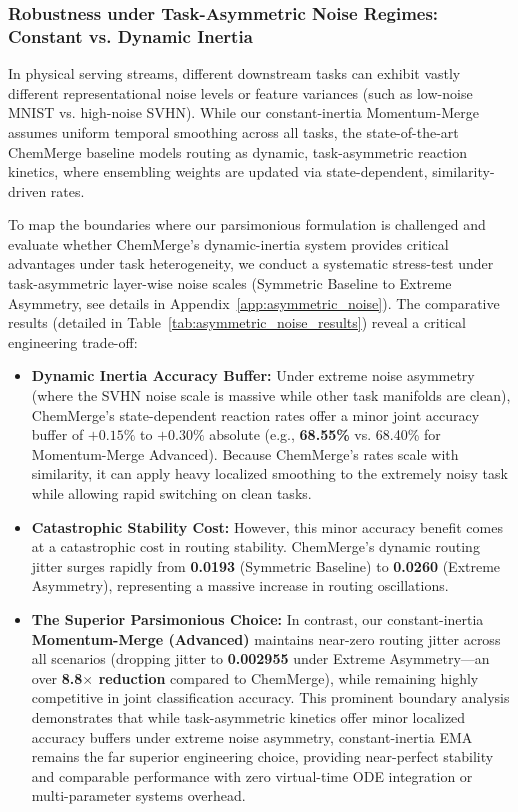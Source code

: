 \subsubsection{Robustness under Task-Asymmetric Noise Regimes: Constant vs. Dynamic Inertia}
In physical serving streams, different downstream tasks can exhibit vastly different representational noise levels or feature variances (such as low-noise MNIST vs. high-noise SVHN). While our constant-inertia Momentum-Merge assumes uniform temporal smoothing across all tasks, the state-of-the-art ChemMerge baseline models routing as dynamic, task-asymmetric reaction kinetics, where ensembling weights are updated via state-dependent, similarity-driven rates. 

To map the boundaries where our parsimonious formulation is challenged and evaluate whether ChemMerge's dynamic-inertia system provides critical advantages under task heterogeneity, we conduct a systematic stress-test under task-asymmetric layer-wise noise scales (Symmetric Baseline to Extreme Asymmetry, see details in Appendix~\ref{app:asymmetric_noise}). The comparative results (detailed in Table~\ref{tab:asymmetric_noise_results}) reveal a critical engineering trade-off:
\begin{itemize}
    \item \textbf{Dynamic Inertia Accuracy Buffer:} Under extreme noise asymmetry (where the SVHN noise scale is massive while other task manifolds are clean), ChemMerge's state-dependent reaction rates offer a minor joint accuracy buffer of $+0.15\%$ to $+0.30\%$ absolute (e.g., \textbf{68.55\%} vs. 68.40\% for Momentum-Merge Advanced). Because ChemMerge's rates scale with similarity, it can apply heavy localized smoothing to the extremely noisy task while allowing rapid switching on clean tasks.
    \item \textbf{Catastrophic Stability Cost:} However, this minor accuracy benefit comes at a catastrophic cost in routing stability. ChemMerge's dynamic routing jitter surges rapidly from \textbf{0.0193} (Symmetric Baseline) to \textbf{0.0260} (Extreme Asymmetry), representing a massive increase in routing oscillations.
    \item \textbf{The Superior Parsimonious Choice:} In contrast, our constant-inertia \textbf{Momentum-Merge (Advanced)} maintains near-zero routing jitter across all scenarios (dropping jitter to \textbf{0.002955} under Extreme Asymmetry—an over \textbf{8.8$\times$ reduction} compared to ChemMerge), while remaining highly competitive in joint classification accuracy. This prominent boundary analysis demonstrates that while task-asymmetric kinetics offer minor localized accuracy buffers under extreme noise asymmetry, constant-inertia EMA remains the far superior engineering choice, providing near-perfect stability and comparable performance with zero virtual-time ODE integration or multi-parameter systems overhead.
\end{itemize}

